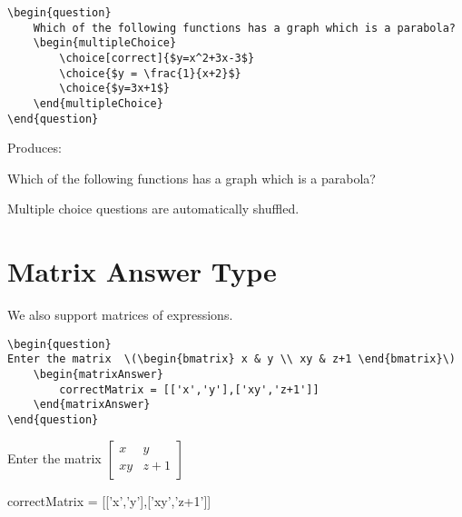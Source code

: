 \documentclass{ximera}
\begin{document}
\begin{verbatim}
\begin{question}
	Which of the following functions has a graph which is a parabola?
	\begin{multipleChoice}
		\choice[correct]{$y=x^2+3x-3$}
		\choice{$y = \frac{1}{x+2}$}
		\choice{$y=3x+1$}
	\end{multipleChoice}
\end{question}
\end{verbatim}

Produces:

\begin{question}
	Which of the following functions has a graph which is a parabola?
	\begin{multipleChoice}
	\end{multipleChoice}
\end{question}

\begin{remark}
Multiple choice questions are automatically shuffled.
\end{remark}

\section{Matrix Answer Type}

We also support matrices of expressions.

\begin{verbatim}
\begin{question}
Enter the matrix  \(\begin{bmatrix} x & y \\ xy & z+1 \end{bmatrix}\)
    \begin{matrixAnswer}
	    correctMatrix = [['x','y'],['xy','z+1']]
    \end{matrixAnswer}
\end{question}
\end{verbatim}

\begin{question}
Enter the matrix  \(\begin{bmatrix} x & y \\ xy & z+1 \end{bmatrix}\)
    \begin{matrixAnswer}
	    correctMatrix = [['x','y'],['xy','z+1']]
    \end{matrixAnswer}
\end{question}
\end{document}
